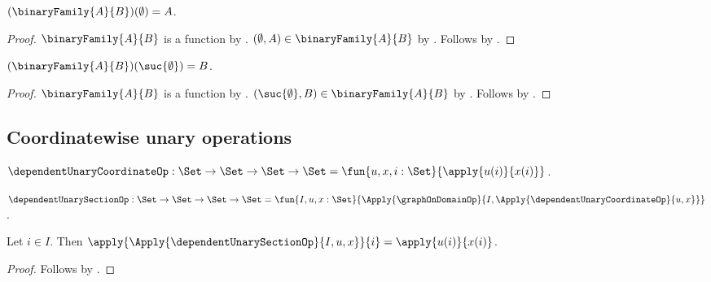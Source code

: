 \begin{proposition}\label{binary_family_left}
    $(\binaryFamily{A}{B})(\emptyset)=A$.
\end{proposition}
\begin{proof}
    $\binaryFamily{A}{B}$ is a function by
        .
    $(\emptyset,A)\in\binaryFamily{A}{B}$ by
        .
    Follows by .
\end{proof}

\begin{proposition}\label{binary_family_right}
    $(\binaryFamily{A}{B})(\suc{\emptyset})=B$.
\end{proposition}
\begin{proof}
    $\binaryFamily{A}{B}$ is a function by
        .
    $(\suc{\emptyset},B)\in\binaryFamily{A}{B}$ by
        .
    Follows by .
\end{proof}

\subsection{Coordinatewise unary operations}

\begin{definition}\label{dependent_unary_coordinate_op}
    $\dependentUnaryCoordinateOp:\Set\to\Set\to\Set\to\Set
        =\fun{u,x,i:\Set}{\apply{u(i)}{x(i)}}$.
\end{definition}

\begin{definition}\label{dependent_unary_section_op}
    $\dependentUnarySectionOp:\Set\to\Set\to\Set\to\Set
        =\fun{I,u,x:\Set}{
            \Apply{\graphOnDomainOp}{
                I,\Apply{\dependentUnaryCoordinateOp}{u,x}}}$.
\end{definition}

\begin{proposition}\label{dependent_unary_section_coordinate}
    Let $i\in I$.
    Then
        $\apply{\Apply{\dependentUnarySectionOp}{I,u,x}}{i}
            =\apply{u(i)}{x(i)}$.
\end{proposition}
\begin{proof}
    Follows by
        .
\end{proof}

